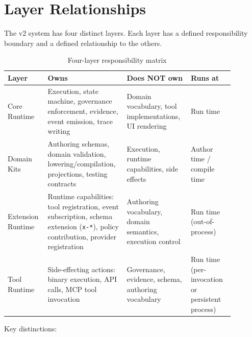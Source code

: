 \section{Layer Relationships}
\label{sec:kit-layers}

The v2 system has four distinct layers.  Each layer has a defined
responsibility boundary and a defined relationship to the others.

\begin{table}[ht]
\centering
\caption{Four-layer responsibility matrix}
\label{tab:kit-layers}
\small
\begin{tabular}{p{0.15\linewidth}p{0.30\linewidth}p{0.25\linewidth}p{0.18\linewidth}}
\toprule
\textbf{Layer} & \textbf{Owns} & \textbf{Does NOT own} & \textbf{Runs at} \\
\midrule
Core Runtime &
  Execution, state machine, governance enforcement, evidence, event emission, trace writing &
  Domain vocabulary, tool implementations, UI rendering &
  Run time \\
\midrule
Domain Kits &
  Authoring schemas, domain validation, lowering/compilation, projections, testing contracts &
  Execution, runtime capabilities, side effects &
  Author time / compile time \\
\midrule
Extension Runtime &
  Runtime capabilities: tool registration, event subscription, schema extension (\texttt{x-*}), policy contribution, provider registration &
  Authoring vocabulary, domain semantics, execution control &
  Run time (out-of-process) \\
\midrule
Tool Runtime &
  Side-effecting actions: binary execution, API calls, MCP tool invocation &
  Governance, evidence, schema, authoring vocabulary &
  Run time (per-invocation or persistent process) \\
\bottomrule
\end{tabular}
\end{table}

Key distinctions:

